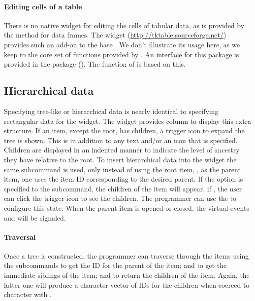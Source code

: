 \paragraph{Editing cells of a table}
There is no native widget for editing the cells of tabular data, as is
provided by the  method for data frames. The
 widget (\url{http://tktable.sourceforge.net/}) provides
such an add-on to the base \TK. We don't illustrate its usage here, as
we keep to the core set of functions provided by \TK.  An interface
for this \TCL\/ package is provided in the  package
().  The  function of 
is based on this.



\subsection{Hierarchical data}

Specifying tree-like or hierarchical data is nearly identical to
specifying rectangular data for the  widget.  The
widget provides column  to display this extra structure. If
an item, except the root, has children, a trigger icon to expand the
tree is shown. This is in addition to any text and/or an icon that is
specified. Children are displayed in an indented manner to indicate
the level of ancestry they have relative to the root.  To insert
hierarchical data into the widget the same
 subcommand is used, only instead of
using the root item, \qcode{}, as the parent item, one uses the item
ID corresponding to the desired parent. If the option 
is specified to the  subcommand, the children of the item
will appear, if , the user can click the trigger icon to
see the children. The programmer can use the
 to configure this state. When the
parent item is opened or closed, the virtual events
 and  will be
signaled.



\paragraph{Traversal}
Once a tree is constructed, the programmer can traverse
through the items using the subcommands
 to get the ID for the parent of the
item;  and
 to get the immediate siblings of the
item; and  to return the children of
the item. Again, the latter one will produce a character vector of  IDs for the
children when coerced to character with .



